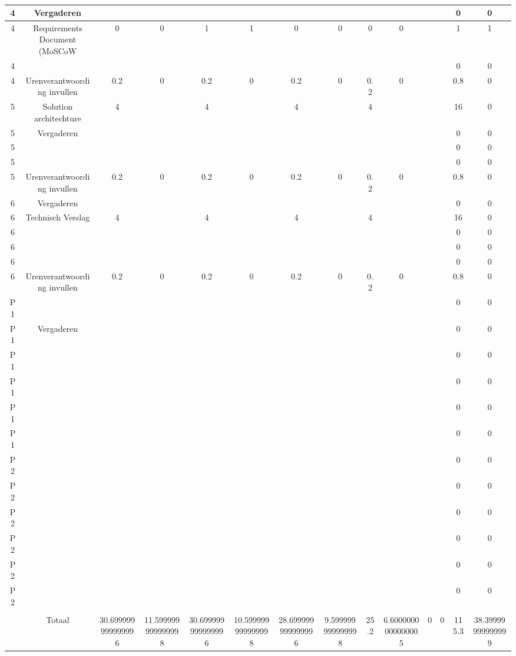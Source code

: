 \begin{table}
\begin{tabular}{|c|c|c|c|c|c|c|c|c|c|c|c|c|c|}
\hline
4 & Vergaderen &  &  &  &  &  &  &  &  &  &  & 0 & 0\\ 
\hline
4 & Requirements Document (MoSCoW & 0 & 0 & 1 & 1 & 0 & 0 & 0 & 0 &  &  & 1 & 1\\ 
\hline
4 &  &  &  &  &  &  &  &  &  &  &  & 0 & 0\\ 
\hline
4 & Urenverantwoording invullen & 0.2 & 0 & 0.2 & 0 & 0.2 & 0 & 0.2 & 0 &  &  & 0.8 & 0\\ 
\hline
5 & Solution architechture & 4 &  & 4 &  & 4 &  & 4 &  &  &  & 16 & 0\\ 
\hline
5 & Vergaderen &  &  &  &  &  &  &  &  &  &  & 0 & 0\\ 
\hline
5 &  &  &  &  &  &  &  &  &  &  &  & 0 & 0\\ 
\hline
5 &  &  &  &  &  &  &  &  &  &  &  & 0 & 0\\ 
\hline
5 & Urenverantwoording invullen & 0.2 & 0 & 0.2 & 0 & 0.2 & 0 & 0.2 & 0 &  &  & 0.8 & 0\\ 
\hline
6 & Vergaderen &  &  &  &  &  &  &  &  &  &  & 0 & 0\\ 
\hline
6 & Technisch Verslag & 4 &  & 4 &  & 4 &  & 4 &  &  &  & 16 & 0\\ 
\hline
6 &  &  &  &  &  &  &  &  &  &  &  & 0 & 0\\ 
\hline
6 &  &  &  &  &  &  &  &  &  &  &  & 0 & 0\\ 
\hline
6 &  &  &  &  &  &  &  &  &  &  &  & 0 & 0\\ 
\hline
6 & Urenverantwoording invullen & 0.2 & 0 & 0.2 & 0 & 0.2 & 0 & 0.2 & 0 &  &  & 0.8 & 0\\ 
\hline
P1 &  &  &  &  &  &  &  &  &  &  &  & 0 & 0\\ 
\hline
P1 & Vergaderen &  &  &  &  &  &  &  &  &  &  & 0 & 0\\ 
\hline
P1 &  &  &  &  &  &  &  &  &  &  &  & 0 & 0\\ 
\hline
P1 &  &  &  &  &  &  &  &  &  &  &  & 0 & 0\\ 
\hline
P1 &  &  &  &  &  &  &  &  &  &  &  & 0 & 0\\ 
\hline
P1 &  &  &  &  &  &  &  &  &  &  &  & 0 & 0\\ 
\hline
P2 &  &  &  &  &  &  &  &  &  &  &  & 0 & 0\\ 
\hline
P2 &  &  &  &  &  &  &  &  &  &  &  & 0 & 0\\ 
\hline
P2 &  &  &  &  &  &  &  &  &  &  &  & 0 & 0\\ 
\hline
P2 &  &  &  &  &  &  &  &  &  &  &  & 0 & 0\\ 
\hline
P2 &  &  &  &  &  &  &  &  &  &  &  & 0 & 0\\ 
\hline
P2 &  &  &  &  &  &  &  &  &  &  &  & 0 & 0\\ 
\hline
 &  &  &  &  &  &  &  &  &  &  &  &  & \\ 
\hline
 & Totaal & 30.699999999999996 & 11.599999999999998 & 30.699999999999996 & 10.599999999999998 & 28.699999999999996 & 9.599999999999998 & 25.2 & 6.6000000000000005 & 0 & 0 & 115.3 & 38.39999999999999\\ 
\hline
\hline\end{tabular}
\label{table:table}
\caption{\small{}} 
\end{table}